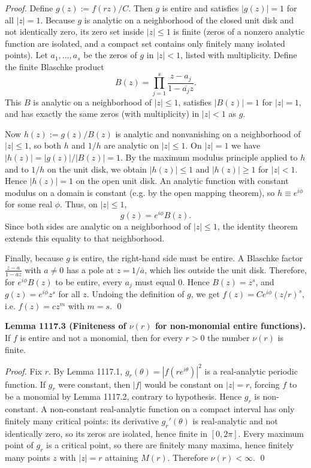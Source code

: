 \emph{Proof.}
Define \(g(z):=f(r z)/C\). Then \(g\) is entire and satisfies \(|g(z)|=1\) for all \(|z|=1\).
Because \(g\) is analytic on a neighborhood of the closed unit disk and not identically zero, its zero set inside \(|z|\le 1\) is finite (zeros of a nonzero analytic function are isolated, and a compact set contains only finitely many isolated points).
Let \(a_1,\dots,a_s\) be the zeros of \(g\) in \(|z|<1\), listed with multiplicity.
Define the finite Blaschke product
\[
B(z)=\prod_{j=1}^s \frac{z-a_j}{1-\overline{a_j}z}.
\]
This \(B\) is analytic on a neighborhood of \(|z|\le 1\), satisfies \(|B(z)|=1\) for \(|z|=1\), and has exactly the same zeros (with multiplicity) in \(|z|<1\) as \(g\).

Now \(h(z):=g(z)/B(z)\) is analytic and nonvanishing on a neighborhood of \(|z|\le 1\), so both \(h\) and \(1/h\) are analytic on \(|z|\le 1\). On \(|z|=1\) we have \(|h(z)|=|g(z)|/|B(z)|=1\). By the maximum modulus principle applied to \(h\) and to \(1/h\) on the unit disk, we obtain
\(|h(z)|\le 1\) and \(|h(z)|\ge 1\) for \(|z|<1\). Hence \(|h(z)|=1\) on the open unit disk. An analytic function with constant modulus on a domain is constant (e.g. by the open mapping theorem), so \(h\equiv e^{i\phi}\) for some real \(\phi\).
Thus, on \(|z|\le 1\),
\[
 g(z)=e^{i\phi} B(z).
\]
Since both sides are analytic on a neighborhood of \(|z|\le 1\), the identity theorem extends this equality to that neighborhood.

Finally, because \(g\) is entire, the right-hand side must be entire. A Blaschke factor \(\frac{z-a}{1-\overline{a}z}\) with \(a\ne 0\) has a pole at \(z=1/\overline{a}\), which lies outside the unit disk. Therefore, for \(e^{i\phi}B(z)\) to be entire, every \(a_j\) must equal \(0\). Hence \(B(z)=z^s\), and \(g(z)=e^{i\phi} z^s\) for all \(z\). Undoing the definition of \(g\), we get
\(f(z)=C e^{i\phi} (z/r)^s\), i.e. \(f(z)=c z^m\) with \(m=s\). \qed

\textbf{Lemma 1117.3 (Finiteness of \(\nu(r)\) for non-monomial entire functions).}
If \(f\) is entire and not a monomial, then for every \(r>0\) the number \(\nu(r)\) is finite.

\emph{Proof.}
Fix \(r\). By Lemma 1117.1, \(g_r(\theta)=|f(r e^{i\theta})|^2\) is a real-analytic periodic function. If \(g_r\) were constant, then \(|f|\) would be constant on \(|z|=r\), forcing \(f\) to be a monomial by Lemma 1117.2, contrary to hypothesis. Hence \(g_r\) is non-constant.
A non-constant real-analytic function on a compact interval has only finitely many critical points: its derivative \(g_r'(\theta)\) is real-analytic and not identically zero, so its zeros are isolated, hence finite in \([0,2\pi]\).
Every maximum point of \(g_r\) is a critical point, so there are finitely many maxima, hence finitely many points \(z\) with \(|z|=r\) attaining \(M(r)\). Therefore \(\nu(r)<\infty\). \qed

